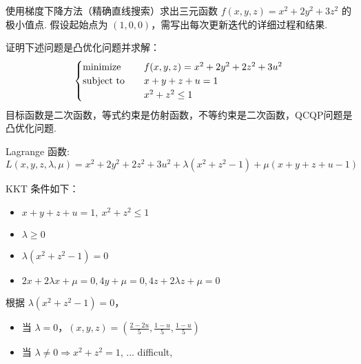 \begin{problem}[问答]
    使用梯度下降方法（精确直线搜索）求出三元函数 $f(x, y, z) = x^2 + 2y^2 + 3z^2$ 的极小值点. 假设起始点为 $(1, 0, 0)$，需写出每次更新迭代的详细过程和结果.
    \Answer 
\end{problem}

\begin{problem}[问答]
    证明下述问题是凸优化问题并求解：\[\begin{cases}
        \operatorname{minimize} \quad &f(x, y, z) = x^2 + 2y^2 + 2z^2 + 3u^2\\
        \operatorname{subject\ to} \quad &x + y + z + u = 1\\
        &x^2 + z^2 \le 1 
    \end{cases}\]
    \Answer 目标函数是二次函数，等式约束是仿射函数，不等约束是二次函数，QCQP问题是凸优化问题.

    Lagrange 函数: $L(x, y, z, \lambda, \mu) = x^2 + 2y^2 + 2z^2 + 3u^2 + \lambda(x^2 + z^2 - 1) + \mu(x + y + z + u - 1)$

    KKT 条件如下：\begin{itemize}
        \item $x + y + z + u = 1,\ x^2 + z^2 \le 1$
        \item $\lambda \ge 0$
        \item $\lambda(x^2 + z^2 - 1) = 0$
        \item $2x + 2\lambda x + \mu = 0, 4y + \mu = 0, 4z + 2\lambda z + \mu = 0$
    \end{itemize}
    根据 $\lambda(x^2 + z^2 - 1) = 0$，\begin{itemize}
        \item 当 $\lambda = 0$，$(x, y, z) = (\frac{2 - 2u}{5}, \frac{1 - u}{5}, \frac{1 - u}{5})$
        \item 当 $\lambda \neq 0 \Longrightarrow x^2 + z^2 = 1$, ... difficult, 
    \end{itemize}
\end{problem}

